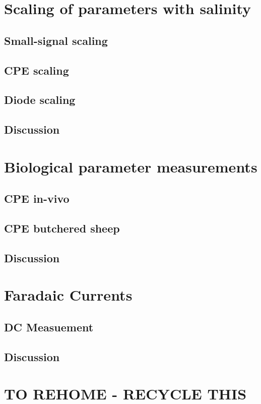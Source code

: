\section{Scaling of parameters with salinity}
\subsection{Small-signal scaling}
\subsection{CPE scaling}
\subsection{Diode scaling}
\subsection{Discussion}

\section{Biological parameter measurements}
\subsection{CPE in-vivo}
\subsection{CPE butchered sheep}
\subsection{Discussion}

\section{Faradaic Currents}
\subsection{DC Measuement}
\subsection{Discussion}


\section{TO REHOME - RECYCLE THIS}

